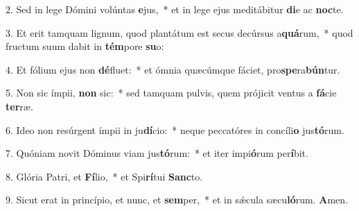 2. Sed in lege Dómini volúntas \textbf{e}jus,~*  et in lege ejus meditábitur \textbf{di}e ac \textbf{noc}te.\

3. Et erit tamquam lignum, quod plantátum est secus decúrsus a\textbf{quá}rum,~*  quod fructum suum dabit in \textbf{tém}pore \textbf{su}o:\

4. Et fólium ejus non \textbf{dé}fluet:~*  et ómnia quæcúmque fáciet, pro\textbf{spe}ra\textbf{bún}tur.\

5. Non sic ímpii, \textbf{non} sic:~*  sed tamquam pulvis, quem prójicit ventus a \textbf{fá}cie \textbf{ter}ræ.\

6. Ideo non resúrgent ímpii in ju\textbf{dí}cio:~*  neque peccatóres in concíli\textbf{o} jus\textbf{tó}rum.\

7. Quóniam novit Dóminus viam jus\textbf{tó}rum:~*  et iter impi\textbf{ó}rum per\textbf{í}bit.\

8. Glória Patri, et \textbf{Fí}lio,~*  et Spi\textbf{rí}tui \textbf{Sanc}to.\

9. Sicut erat in princípio, et nunc, et \textbf{sem}per,~*  et in sǽcula sæcu\textbf{ló}rum. \textbf{A}men.\

